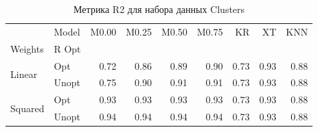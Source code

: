 \begin{table}
\caption{Метрика R2 для набора данных Clusters}
\label{tab:R2_Clusters}
\begin{tabular}{llrrrrrrr}
\toprule
 & Model & M0.00 & M0.25 & M0.50 & M0.75 & KR & XT & KNN \\
Weights & R Opt &  &  &  &  &  &  &  \\
\midrule
\multirow[t]{2}{*}{Linear} & Opt & 0.72 & 0.86 & 0.89 & 0.90 & 0.73 & 0.93 & 0.88 \\
 & Unopt & 0.75 & 0.90 & 0.91 & 0.91 & 0.73 & 0.93 & 0.88 \\

\multirow[t]{2}{*}{Squared} & Opt & 0.93 & 0.93 & 0.93 & 0.93 & 0.73 & 0.93 & 0.88 \\
 & Unopt & 0.94 & 0.94 & 0.94 & 0.94 & 0.73 & 0.93 & 0.88 \\

\bottomrule
\end{tabular}
\end{table}
